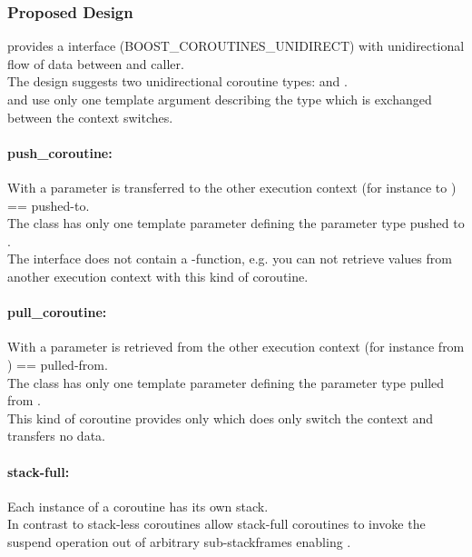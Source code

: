 
\subsubsection*{Proposed Design}
\boostcoroutine provides a interface (BOOST\_COROUTINES\_UNIDIRECT) with
unidirectional flow of data between \corofunction and caller.\\
The design suggests two unidirectional coroutine types: \pushcoro and
\pullcoro.\\
\pullcoro and \pushcoro use only one template argument describing the type which
is exchanged between the context switches.

\paragraph*{push\_coroutine:}
With \pushcoro a parameter is transferred to the other execution context (for
instance to \corofunction) == pushed-to.\\
The class has only one template parameter defining the parameter type pushed to
\corofunction.\\
\newline
The interface does not contain a -function, e.g. you can not retrieve
values from another execution context with this kind of coroutine.

\paragraph*{pull\_coroutine:}
With \pullcoro a parameter is retrieved from the other execution context (for
instance from \corofunction) == pulled-from.\\
The class has only one template parameter defining the parameter type pulled
from \corofunction.\\
\newline
This kind of coroutine provides only \pullcoroop which does only switch the
context and transfers no data.

\paragraph*{stack-full:}
Each instance of a coroutine has its own stack.\\
\newline
In contrast to stack-less coroutines allow stack-full coroutines to invoke the
suspend operation out of arbitrary sub-stackframes enabling \escreops.

